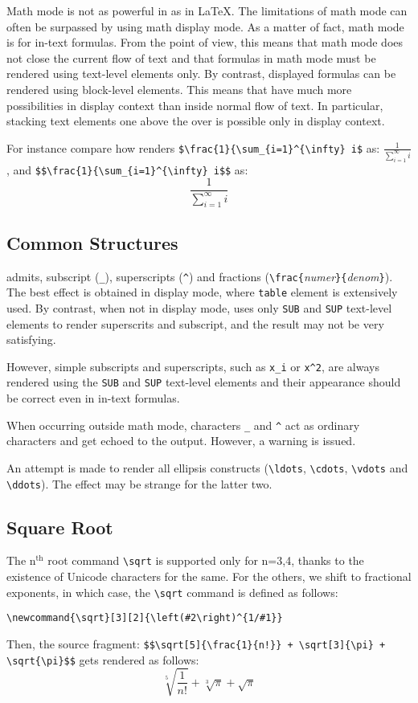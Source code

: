 Math mode is not as powerful in \hevea{} as in \LaTeX{}.  The
limitations of math mode can often be surpassed by using math display
mode.  As a matter of fact, math mode is for in-text formulas. From
the \html{} point of view, this means that math mode does not close
the current flow of text and that formulas in math mode must be
rendered using text-level elements only.  By contrast, displayed
formulas can be rendered using block-level elements.  This means that
\hevea{} have much more possibilities in display context than inside
normal flow of text.  In particular, stacking text elements one above
the over is possible only in display context.
\begin{htmlonly}
For instance compare how \hevea{} renders
\verb+$\frac{1}{\sum_{i=1}^{\infty} i$+
as: $\frac{1}{\sum_{i=1}^{\infty} i}$, and 
\verb+$$\frac{1}{\sum_{i=1}^{\infty} i$$+ as:
$$\frac{1}{\sum_{i=1}^{\infty} i}$$
\end{htmlonly}


\subsection{Common Structures}

\hevea{} admits, subscript (\verb+_+), superscripts (\verb+^+) and
fractions (\verb+\frac{+{\it numer}\verb+}{+{\it denom}\verb+}+).
The best effect is obtained in display mode, where \html{}
\verb+table+ element is extensively used.
By contrast, when not in display mode, \hevea{} uses only
\verb+SUB+ and \verb+SUP+ text-level elements to render superscrits
and subscript, and the result may not be very satisfying.

However,
simple subscripts and superscripts, such as \verb+x_i+ or \verb+x^2+,
are always rendered using the \verb+SUB+
and \verb+SUP+ text-level elements and their appearance should be correct
even in in-text formulas.

When occurring outside math mode, characters \verb+_+ and \verb+^+ act as
ordinary characters and get echoed to the output. However, a warning
is issued.

An attempt is made to render all ellipsis constructs (\verb+\ldots+,
\verb+\cdots+, \verb+\vdots+ and \verb+\ddots+). The effect may be
strange for the latter two.

\subsection{Square Root}
\index{\verb+\sqrt+}
The n$^{\mbox{th}}$ root command \verb+\sqrt+ is supported only for n=3,4, thanks to the existence of Unicode characters for the same. For the others, we shift to fractional exponents, in which case, the \verb+\sqrt+ command is
defined as follows:
\begin{verbatim}
\newcommand{\sqrt}[3][2]{\left(#2\right)^{1/#1}}
\end{verbatim}
\begin{htmlonly}
Then, the source
fragment: \verb"$$\sqrt[5]{\frac{1}{n!}} + \sqrt[3]{\pi} + \sqrt{\pi}$$" gets rendered
as follows:
$$
\sqrt[5]{\frac{1}{n!}} + \sqrt[3]{\pi} + \sqrt{\pi}
$$
\end{htmlonly}

